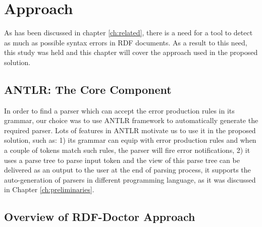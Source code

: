 \chapter{Approach}
\label{ch:approach}
As has been discussed in chapter \ref{ch:related}, there is a need for a tool to detect as much as possible syntax errors in RDF documents. As a result to this need, this study was held and this chapter will cover the approach used in the proposed solution.

\section{ANTLR: The Core Component}
In order to find a parser which can accept the error production rules in its grammar, our choice was to use ANTLR framework to automatically generate the required parser. Lots of features in ANTLR motivate us to use it in the proposed solution, such as: 1) its grammar can equip with error production rules and when a couple of tokens match such rules, the parser will fire  error notifications, 2) it uses a parse tree to parse input token and the view of this parse tree can be delivered as an output to the user at the end of parsing process, it supports the auto-generation of parsers in different programming language, as it was discussed in Chapter \ref{ch:preliminaries}.
\section{Overview of RDF-Doctor Approach}

